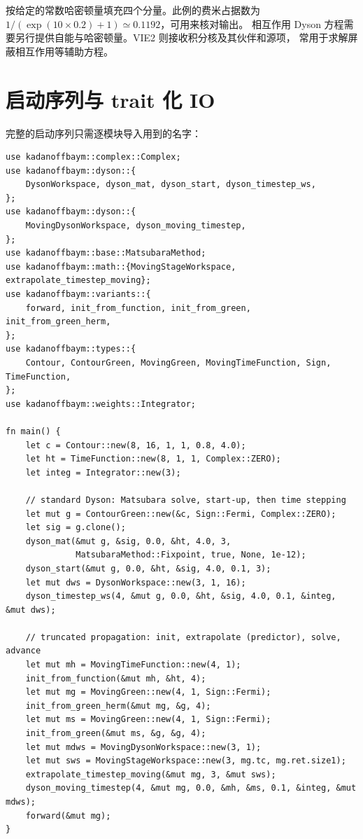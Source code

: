  按给定的常数哈密顿量填充四个分量。此例的费米占据数为
$1/(\exp(10\times0.2)+1)\simeq 0.1192$，可用来核对输出。
相互作用 Dyson 方程需要另行提供自能与哈密顿量。VIE2 则接收积分核及其伙伴和源项，
常用于求解屏蔽相互作用等辅助方程。

\section{启动序列与 trait 化 IO}
\label{sec:boot}

完整的启动序列只需逐模块导入用到的名字：
\begin{lstlisting}[caption={标准与截断路径的启动序列},label={lst:boot}]
use kadanoffbaym::complex::Complex;
use kadanoffbaym::dyson::{
    DysonWorkspace, dyson_mat, dyson_start, dyson_timestep_ws,
};
use kadanoffbaym::dyson::{
    MovingDysonWorkspace, dyson_moving_timestep,
};
use kadanoffbaym::base::MatsubaraMethod;
use kadanoffbaym::math::{MovingStageWorkspace, extrapolate_timestep_moving};
use kadanoffbaym::variants::{
    forward, init_from_function, init_from_green, init_from_green_herm,
};
use kadanoffbaym::types::{
    Contour, ContourGreen, MovingGreen, MovingTimeFunction, Sign, TimeFunction,
};
use kadanoffbaym::weights::Integrator;

fn main() {
    let c = Contour::new(8, 16, 1, 1, 0.8, 4.0);
    let ht = TimeFunction::new(8, 1, 1, Complex::ZERO);
    let integ = Integrator::new(3);

    // standard Dyson: Matsubara solve, start-up, then time stepping
    let mut g = ContourGreen::new(&c, Sign::Fermi, Complex::ZERO);
    let sig = g.clone();
    dyson_mat(&mut g, &sig, 0.0, &ht, 4.0, 3,
              MatsubaraMethod::Fixpoint, true, None, 1e-12);
    dyson_start(&mut g, 0.0, &ht, &sig, 4.0, 0.1, 3);
    let mut dws = DysonWorkspace::new(3, 1, 16);
    dyson_timestep_ws(4, &mut g, 0.0, &ht, &sig, 4.0, 0.1, &integ, &mut dws);

    // truncated propagation: init, extrapolate (predictor), solve, advance
    let mut mh = MovingTimeFunction::new(4, 1);
    init_from_function(&mut mh, &ht, 4);
    let mut mg = MovingGreen::new(4, 1, Sign::Fermi);
    init_from_green_herm(&mut mg, &g, 4);
    let mut ms = MovingGreen::new(4, 1, Sign::Fermi);
    init_from_green(&mut ms, &g, &g, 4);
    let mut mdws = MovingDysonWorkspace::new(3, 1);
    let mut sws = MovingStageWorkspace::new(3, mg.tc, mg.ret.size1);
    extrapolate_timestep_moving(&mut mg, 3, &mut sws);
    dyson_moving_timestep(4, &mut mg, 0.0, &mh, &ms, 0.1, &integ, &mut mdws);
    forward(&mut mg);
}
\end{lstlisting}

